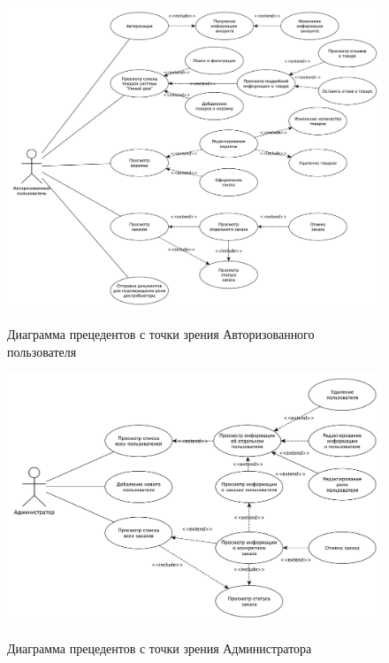 \begin{figure}[H]
	\begin{center}
		{\includegraphics[scale = 0.4]{../img/use-case/auth-user.pdf}}
		\caption{Диаграмма прецедентов с точки зрения Авторизованного пользователя}
		\label{fig:use-case-auth}
	\end{center}
\end{figure}

\begin{figure}[H]
	\begin{center}
		{\includegraphics[scale = 0.5]{../img/use-case/admin.pdf}}
		\caption{Диаграмма прецедентов с точки зрения Администратора}
		\label{fig:use-case-admin}
	\end{center}
\end{figure}


